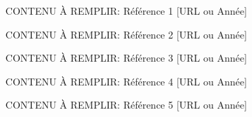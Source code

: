 
\begin{enumerate}

    \item [CONTENU À REMPLIR: Référence 1] [URL ou Année]
    
    \item [CONTENU À REMPLIR: Référence 2] [URL ou Année]
    
    \item [CONTENU À REMPLIR: Référence 3] [URL ou Année]
    
    \item [CONTENU À REMPLIR: Référence 4] [URL ou Année]
    
    \item [CONTENU À REMPLIR: Référence 5] [URL ou Année]

\end{enumerate}

% 
%     
%     
%     
%     
% 

